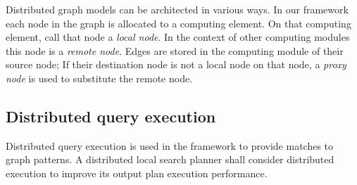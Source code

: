 Distributed graph models can be architected in various ways. 
In our framework each node in the graph is allocated to a computing element. 
On that computing element, call that node a \emph{local node}. 
In the context of other computing modules this node is a \emph{remote node}. 
Edges are stored in the computing module of their source node; 
If their destination node is not a local node on that node, a \emph{proxy node} is used to substitute the remote node.

\subsection{Distributed query execution}

Distributed query execution is used in the framework to provide matches to graph patterns. 
A distributed local search planner shall consider distributed execution to improve its output plan execution performance.







